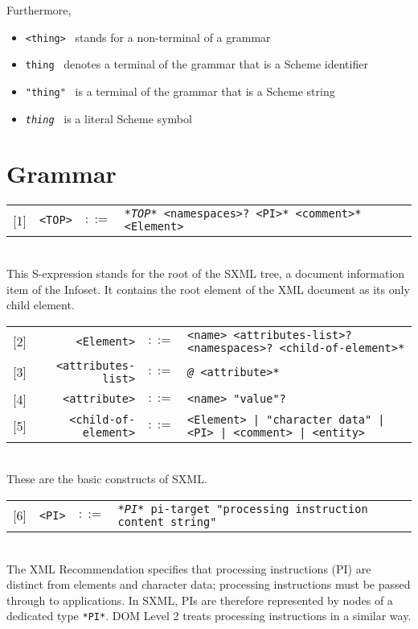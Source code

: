 \documentclass[10pt]{article}
\begin{document}
Furthermore, 

\begin{itemize}
\item \texttt{<thing>}~ stands for a non-terminal of a grammar
\item \texttt{thing}~ denotes a terminal of the grammar that is a Scheme identifier
\item \texttt{"thing"}~ is a terminal of the grammar that is a Scheme string
\item \texttt{\textit{thing}}~ is a literal Scheme symbol
\end{itemize}
\section{Grammar}
\begin{tabular}{rrcp{2.8in}}
{[}1{]} & \texttt{<TOP>} &  $::=$ & \texttt{\textit{*TOP*} <namespaces>? <PI>* <comment>* <Element> } \\
\end{tabular}
\\
This S-expression stands for the root of the SXML tree, a
document information item of the Infoset. It contains the root element
of the XML document as its only child element.

\begin{tabular}{rrcp{2.8in}}
{[}2{]} & \texttt{<Element>} &  $::=$ & \texttt{<name> <attributes-list>? <namespaces>? <child-of-element>* } \\
{[}3{]} & \texttt{<attributes-list>} &  $::=$ & \texttt{\textit{@} <attribute>* } \\
{[}4{]} & \texttt{<attribute>} &  $::=$ & \texttt{<name> "value"? } \\
{[}5{]} & \texttt{<child-of-element>} &  $::=$ & \texttt{<Element> | "character data" | <PI> | <comment> | <entity> } \\
\end{tabular}
\\
These are the basic constructs of SXML.

\begin{tabular}{rrcp{2.8in}}
{[}6{]} & \texttt{<PI>} &  $::=$ & \texttt{\textit{*PI*} pi-target "processing instruction content string" } \\
\end{tabular}
\\
The XML Recommendation specifies that processing instructions (PI) are distinct from elements and character data; processing
instructions must be passed through to applications. In SXML, PIs are
therefore represented by nodes of a dedicated type \texttt{*PI*}. DOM Level 2 treats processing instructions in a similar way.
\end{document}
